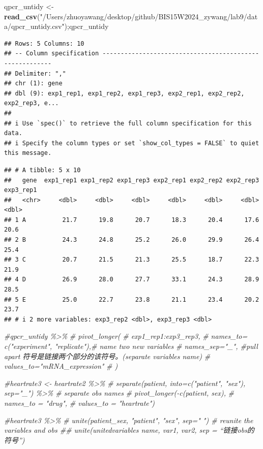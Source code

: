 \documentclass[
]{article}
\newenvironment{Shaded}{\begin{snugshade}}{\end{snugshade}}
\newcommand{\CommentTok}[1]{\textcolor[rgb]{0.56,0.35,0.01}{\textit{#1}}}
\newcommand{\FunctionTok}[1]{\textcolor[rgb]{0.13,0.29,0.53}{\textbf{#1}}}
\newcommand{\NormalTok}[1]{#1}
\newcommand{\OtherTok}[1]{\textcolor[rgb]{0.56,0.35,0.01}{#1}}
\newcommand{\StringTok}[1]{\textcolor[rgb]{0.31,0.60,0.02}{#1}}
\begin{document}
\begin{Shaded}
\begin{Highlighting}[]
\NormalTok{qpcr\_untidy }\OtherTok{\textless{}{-}} \FunctionTok{read\_csv}\NormalTok{(}\StringTok{"/Users/zhuoyawang/desktop/github/BIS15W2024\_zywang/lab9/data/qpcr\_untidy.csv"}\NormalTok{);qpcr\_untidy}
\end{Highlighting}
\end{Shaded}

\begin{verbatim}
## Rows: 5 Columns: 10
## -- Column specification --------------------------------------------------------
## Delimiter: ","
## chr (1): gene
## dbl (9): exp1_rep1, exp1_rep2, exp1_rep3, exp2_rep1, exp2_rep2, exp2_rep3, e...
## 
## i Use `spec()` to retrieve the full column specification for this data.
## i Specify the column types or set `show_col_types = FALSE` to quiet this message.
\end{verbatim}

\begin{verbatim}
## # A tibble: 5 x 10
##   gene  exp1_rep1 exp1_rep2 exp1_rep3 exp2_rep1 exp2_rep2 exp2_rep3 exp3_rep1
##   <chr>     <dbl>     <dbl>     <dbl>     <dbl>     <dbl>     <dbl>     <dbl>
## 1 A          21.7      19.8      20.7      18.3      20.4      17.6      20.6
## 2 B          24.3      24.8      25.2      26.0      29.9      26.4      25.4
## 3 C          20.7      21.5      21.3      25.5      18.7      22.3      21.9
## 4 D          26.9      28.0      27.7      33.1      24.3      28.9      28.5
## 5 E          25.0      22.7      23.8      21.1      23.4      20.2      23.7
## # i 2 more variables: exp3_rep2 <dbl>, exp3_rep3 <dbl>
\end{verbatim}

\begin{Shaded}
\begin{Highlighting}[]
\CommentTok{\#qpcr\_untidy \%\textgreater{}\% }
\CommentTok{\#  pivot\_longer(}
\CommentTok{\#    exp1\_rep1:exp3\_rep3,}
\CommentTok{\#    names\_to= c("experiment", "replicate"),\# name two new variables}
\CommentTok{\#    names\_sep="\_", \#pull apart 符号是链接两个部分的该符号。(separate variables name)}
\CommentTok{\#    values\_to="mRNA\_expression"}
\CommentTok{\#  )}

\CommentTok{\#heartrate3 \textless{}{-} heartrate2 \%\textgreater{}\% }
\CommentTok{\#  separate(patient, into=c("patient", "sex"), sep="\_") \%\textgreater{}\%  \# separate obs names}
\CommentTok{\#  pivot\_longer({-}c(patient, sex),}
\CommentTok{\#               names\_to = "drug",}
\CommentTok{\#               values\_to = "heartrate") }

\CommentTok{\#heartrate3 \%\textgreater{}\% }
\CommentTok{\#  unite(patient\_sex, "patient", "sex", sep=" ") \# reunite the variables and obs \#\# unite(unitedvariables\textquotesingle{} name, var1, var2, sep = “链接obs的符号”)}
\end{Highlighting}
\end{Shaded}
\end{document}
